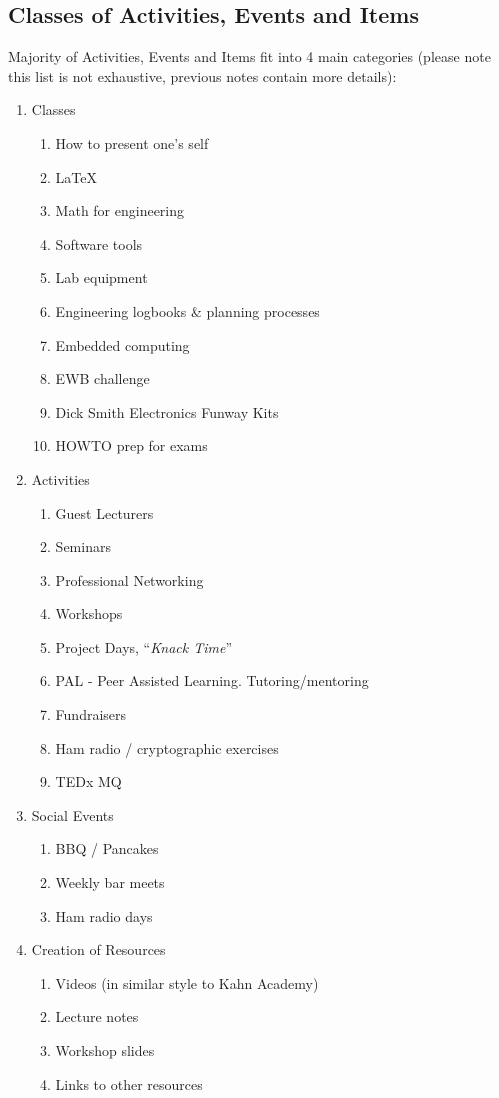 \subsection{Classes of Activities, Events and Items}
Majority of Activities, Events and Items fit into 4 main categories (please
note this list is not exhaustive, previous notes contain more details):
\begin{enumerate}
  \item Classes
    \begin{enumerate}
      \item How to present one's self
      \item \LaTeX
      \item Math for engineering
      \item Software tools
      \item Lab equipment
      \item Engineering logbooks \& planning processes
      \item Embedded computing
      \item EWB challenge
      \item Dick Smith Electronics Funway Kits
      \item HOWTO prep for exams
    \end{enumerate}
  \item Activities
    \begin{enumerate}
      \item Guest Lecturers
      \item Seminars
      \item Professional Networking
      \item Workshops
      \item Project Days, ``\emph{Knack Time}''
      \item PAL - Peer Assisted Learning. Tutoring/mentoring
      \item Fundraisers
      \item Ham radio / cryptographic exercises
      \item TEDx MQ
    \end{enumerate}
  \item Social Events
    \begin{enumerate}
      \item BBQ / Pancakes
      \item Weekly bar meets
      \item Ham radio days 
    \end{enumerate}
  \item Creation of Resources
    \begin{enumerate}
      \item Videos (in similar style to Kahn Academy)
      \item Lecture notes
      \item Workshop slides
      \item Links to other resources
    \end{enumerate}
\end{enumerate}